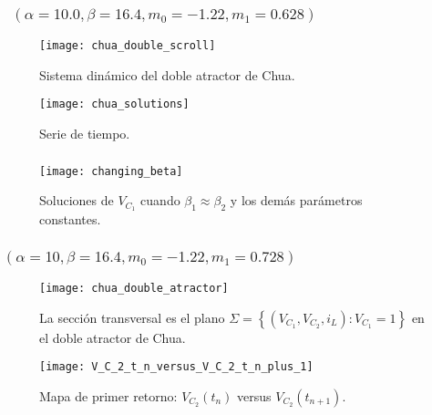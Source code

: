 \begin{frame}
	\frametitle{\secname~$\left(\alpha=10.0, \beta=16.4, m_{0}=-1.22, m_{1}=0.628\right)$}

	\begin{minipage}{0.45\textwidth}
		\begin{figure}[ht!]
			\centering
			\texttt{[image: chua\_double\_scroll]}
			\caption{
				Sistema dinámico del doble atractor de Chua.
			}\label{fig:chua_double_scroll}
		\end{figure}
	\end{minipage}
	\begin{minipage}{0.45\textwidth}
		\begin{figure}[ht!]
			\centering
			\texttt{[image: chua\_solutions]}
			\caption{
				Serie de tiempo.
			}\label{fig:chua_solutions}
		\end{figure}
	\end{minipage}
\end{frame}

\begin{frame}
	\frametitle{\secname} %

	\begin{figure}[ht!]
		\centering
		\texttt{[image: changing\_beta]}
		\caption{
			Soluciones de $V_{C_{1}}$ cuando $\beta_{1}\approx\beta_{2}$ y los demás parámetros constantes.
		}\label{fig:changing_beta}
	\end{figure}

\end{frame}

\begin{frame}
	\frametitle{\secname\quad$\left(\alpha=10,\beta=16.4,m_{0}=-1.22,m_{1}=0.728\right)$}

	\begin{minipage}{0.45\textwidth}
		\begin{figure}[ht!]
			\centering
			\texttt{[image: chua\_double\_atractor]}
			\caption{
				La sección transversal es el plano
				\begin{math}
					\Sigma=\left\{\left(V_{C_{1}},V_{C_{2}},i_{L}\right):V_{C_{1}}=1\right\}
				\end{math}
				en el doble atractor de Chua.
			}\label{fig:chua_doble_atractor}
		\end{figure}
	\end{minipage}
	\begin{minipage}{0.45\textwidth}
		\begin{figure}[ht!]
			\centering
			\texttt{[image: V\_C\_2\_t\_n\_versus\_V\_C\_2\_t\_n\_plus\_1]}
			\caption{
				Mapa de primer retorno: $V_{C_{2}}\left(t_{n}\right)$ versus $V_{C_{2}}\left(t_{n+1}\right)$.
			}\label{fig:chua_solutions}
		\end{figure}
	\end{minipage}
\end{frame}

